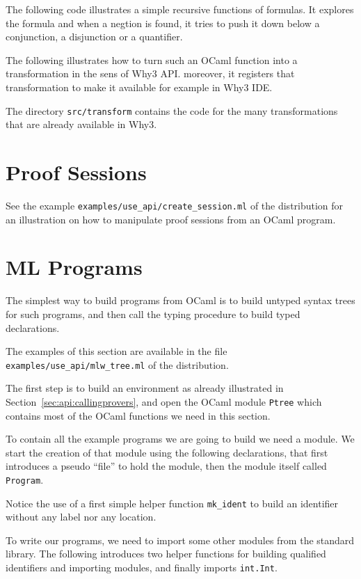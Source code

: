 The following code illustrates a simple recursive functions of
formulas. It explores the formula and when a negtion is found, it
tries to push it down below a conjunction, a disjunction or a
quantifier.


The following illustrates how to turn such an OCaml function into a
transformation in the sens of Why3 API. moreover, it registers that
transformation to make it available for example in Why3 IDE.


The directory \verb|src/transform| contains the code for the many
transformations that are already available in Why3.

\section{Proof Sessions}

See the example \verb|examples/use_api/create_session.ml| of the
distribution for an illustration on how to manipulate proof sessions
from an OCaml program.

\section{ML Programs}

The simplest way to build \whyml programs from OCaml is to build
untyped syntax trees for such programs, and then
call the \why typing procedure to build typed declarations.

The examples of this section are available in the file
\verb|examples/use_api/mlw_tree.ml| of the distribution.

The first step is to build an environment as already illustrated in
Section~\ref{sec:api:callingprovers}, and open the OCaml module
\verb|Ptree| which contains most of the OCaml functions we need in
this section.


To contain all the example programs we are going to build we need a
module. We start the creation of that module using the following
declarations, that first introduces a pseudo ``file'' to hold the
module, then the module itself called \verb|Program|.

Notice the use of a first
simple helper function \verb|mk_ident| to build an identifier without
any label nor any location.

To write our programs, we need to import some other modules from the
standard library. The following introduces two helper functions for
building qualified identifiers and importing modules, and finally
imports \verb|int.Int|.


